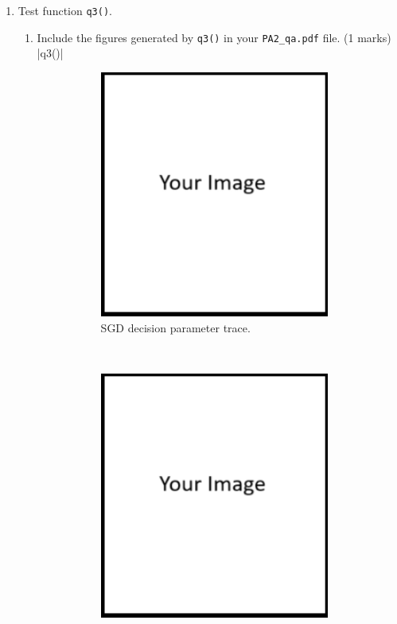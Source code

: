 \documentclass{article}
\theoremstyle{definition}
\newtheorem*{answer}{Answer}
\begin{document}
\begin{enumerate}[label=\ref{partsgd}.\alph*]
\begin{enumerate}[label=1.2.b.\roman*]
\begin{figure}[h]
\begin{subfigure}[t]{0.5\textwidth}
					\caption{SGD Loss vs. iteration.}
				\end{subfigure}
				\caption{Figures generated by .}
			\end{figure}
		\item When $\eta=0.05$, SGD would fail to converge to the optimal solution. What causes such behavior? (1 marks)
		\begin{answer}
			Your answer ...
		\end{answer}
	\end{enumerate}
	\newpage
	\item Test function \verb|q3()|.
	\begin{enumerate}[label=1.2.c.\roman*]
		\item Include the figures generated by \verb|q3()| in your \verb|PA2_qa.pdf| file. (1 marks)
			|q3()|
			\begin{figure}[h]
				\centering
				\begin{subfigure}[t]{0.5\textwidth}
					\centering
					\includegraphics[height=3.2in]{image.png}
					\caption{SGD decision parameter trace.}
				\end{subfigure}%
				~ 
				\begin{subfigure}[t]{0.5\textwidth}
					\centering
					\includegraphics[height=3.2in]{image.png}

\end{subfigure}
\end{figure}
\end{enumerate}
\end{enumerate}
\end{document}
